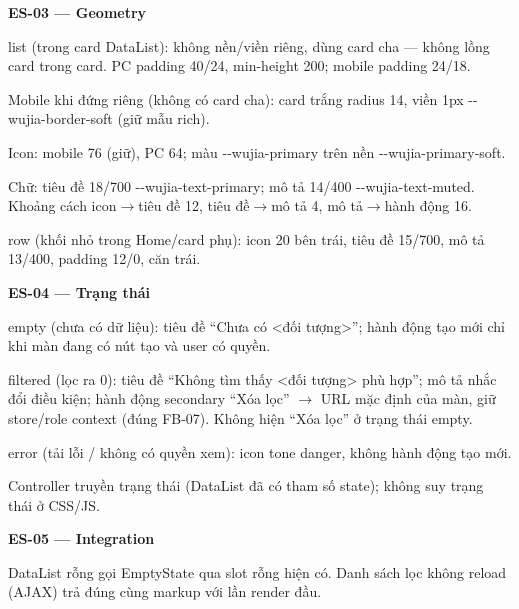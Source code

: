 \documentclass[11pt,a4paper]{report}
\begin{document}
\par\smallskip\textbf{ES-03 — Geometry}\par
list (trong card DataList): không nền/\allowbreak{}viền riêng, dùng card cha — không lồng card trong card. PC padding 40/\allowbreak{}24, min-\allowbreak{}height 200; mobile padding 24/\allowbreak{}18.\par
Mobile khi đứng riêng (không có card cha): card trắng radius 14, viền 1px -\kern0pt-\allowbreak{}wujia-\allowbreak{}border-\allowbreak{}soft (giữ mẫu rich).\par
Icon: mobile 76 (giữ), PC 64; màu -\kern0pt-\allowbreak{}wujia-\allowbreak{}primary trên nền -\kern0pt-\allowbreak{}wujia-\allowbreak{}primary-\allowbreak{}soft.\par
Chữ: tiêu đề 18/\allowbreak{}700 -\kern0pt-\allowbreak{}wujia-\allowbreak{}text-\allowbreak{}primary; mô tả 14/\allowbreak{}400 -\kern0pt-\allowbreak{}wujia-\allowbreak{}text-\allowbreak{}muted. Khoảng cách icon\(\to\)tiêu đề 12, tiêu đề\(\to\)mô tả 4, mô tả\(\to\)hành động 16.\par
row (khối nhỏ trong Home/\allowbreak{}card phụ): icon 20 bên trái, tiêu đề 15/\allowbreak{}700, mô tả 13/\allowbreak{}400, padding 12/\allowbreak{}0, căn trái.\par

\par\smallskip\textbf{ES-04 — Trạng thái}\par
empty (chưa có dữ liệu): tiêu đề “Chưa có \textless{}đối tượng\textgreater{}”; hành động tạo mới chỉ khi màn đang có nút tạo và user có quyền.\par
filtered (lọc ra 0): tiêu đề “Không tìm thấy \textless{}đối tượng\textgreater{} phù hợp”; mô tả nhắc đổi điều kiện; hành động secondary “Xóa lọc” \(\to\) URL mặc định của màn, giữ store/\allowbreak{}role context (đúng FB-07). Không hiện “Xóa lọc” ở trạng thái empty.\par
error (tải lỗi / không có quyền xem): icon tone danger, không hành động tạo mới.\par
Controller truyền trạng thái (DataList đã có tham số state); không suy trạng thái ở CSS/\allowbreak{}JS.\par

\par\smallskip\textbf{ES-05 — Integration}\par
DataList rỗng gọi EmptyState qua slot rỗng hiện có. Danh sách lọc không reload (AJAX) trả đúng cùng markup với lần render đầu.\par
\end{document}
